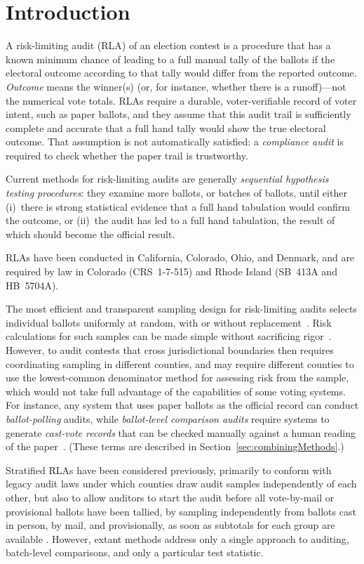 \documentclass[runningheads]{llncs}
\begin{document}
\section{Introduction}
A risk-limiting audit (RLA) of an election contest is a procedure that
has a known minimum chance of leading to a full manual tally of the ballots if the electoral outcome  according to that tally would differ from the reported outcome.
\emph{Outcome} means the winner(s) (or, for instance, whether there is a runoff)---not the numerical vote totals. 
RLAs require a durable, voter-verifiable record of voter intent, such as paper ballots,
and they assume that this audit trail is sufficiently complete and accurate that a full hand
tally would show the true electoral outcome.
That assumption is not automatically satisfied: a \emph{compliance audit}
\cite{starkWagner12} 
is required to check whether the paper trail is trustworthy.

Current methods for risk-limiting audits are generally \emph{sequential hypothesis testing procedures}: they examine more ballots, or batches of ballots,
until either (i)~there is strong statistical evidence that a full hand tabulation would confirm the outcome,
or (ii)~the audit has led to a full hand tabulation, the result of which should become the official
result.

RLAs have been conducted in California, Colorado, Ohio, and Denmark, and are required by law in Colorado (CRS~1-7-515) and Rhode Island (SB~413A and HB~5704A).

The most efficient and transparent sampling design for risk-limiting audits selects individual ballots uniformly at random, with or without replacement~\cite{stark10c}.
Risk calculations for such samples can be made simple without sacrificing rigor~\cite{stark10d,lindemanStark12}.
However, to audit contests that cross jurisdictional boundaries then requires coordinating sampling in different counties, and may require different counties to use the lowest-common denominator method for assessing risk from the sample, which would not take full advantage of the capabilities of some voting systems. 
For instance, any system that uses paper ballots as the official record can conduct \emph{ballot-polling} audits, while \emph{ballot-level comparison audits} require systems to generate \emph{cast-vote records} that can be checked manually against a human reading of the paper~\cite{lindemanEtal12,lindemanStark12}. 
(These terms are described in Section~\ref{sec:combiningMethods}.) 

Stratified RLAs have been considered previously, primarily to conform with legacy audit laws under which counties draw audit samples independently of each other, but also to allow auditors to start the audit before all vote-by-mail or provisional ballots have been tallied, by sampling independently from ballots cast in person, by mail, and provisionally, as soon as subtotals for each group are available \cite{stark08a,higginsEtal11}.
However, extant methods address only a single approach to auditing, batch-level comparisons, and only a particular test statistic.
\end{document}

